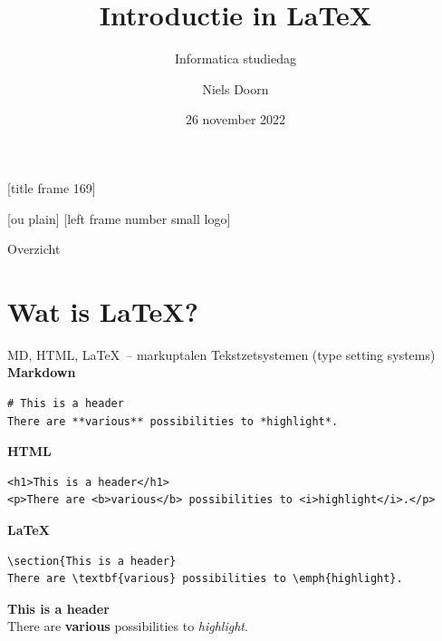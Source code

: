 \documentclass[aspectratio=169]{beamer}
\title{Introductie in \LaTeX}
\subtitle{Informatica studiedag}
\author{Niels Doorn}
\date{26 november 2022}
\begin{document}
[title frame 169]
\begin{frame}
  \titlepage
\end{frame}

[ou plain]
[left frame number small logo]

\begin{frame}{Overzicht}
\tableofcontents[hideallsubsections]
\end{frame}


\section{Wat is \LaTeX?}

\begin{frame}[fragile]{MD, HTML, \LaTeX\ -- markuptalen}
Tekstzetsystemen (type setting systems)
\pause
\\
\textbf{Markdown}
\begin{verbatim}
# This is a header
There are **various** possibilities to *highlight*.
\end{verbatim}
\pause
\textbf{HTML}
\begin{verbatim}
<h1>This is a header</h1>
<p>There are <b>various</b> possibilities to <i>highlight</i>.</p>
\end{verbatim}
\pause
\textbf{\LaTeX}
\begin{verbatim}
\section{This is a header}
There are \textbf{various} possibilities to \emph{highlight}.
\end{verbatim}
\pause
\begin{tcolorbox}
 {\Large {\bf This is a header}}\\
 There are \textbf{various} possibilities to \emph{highlight}.
\end{tcolorbox}

\end{frame}
\end{document}
